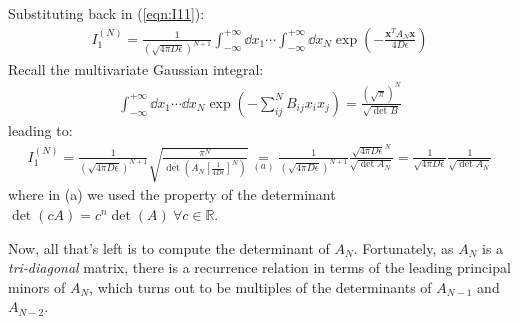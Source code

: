 \documentclass[../template.tex]{subfiles}
\begin{document}
Substituting back in (\ref{eqn:I11}):
\begin{align*}
    I_1^{(N)} = \frac{1}{(\sqrt{4 \pi D \epsilon})^{N+1}} \int_{-\infty}^{+\infty} \dd{x_1} \cdots \int_{-\infty}^{+\infty} \dd{x_N} \exp\left(-\frac{\bm{x}^T A_N \bm{x}}{4 D \epsilon}  \right)  
\end{align*}
Recall the multivariate Gaussian integral:
\begin{align*}
    \int_{-\infty}^{+\infty} \dd{x_1} \cdots \dd{x_N} \exp\left(-\sum_{ij}^N B_{ij} x_i x_j\right) = \frac{(\sqrt{\pi})^N}{\sqrt{\operatorname{det}B }} 
\end{align*}
leading to:
\begin{align}
    I_1^{(N)} = \frac{1}{(\sqrt{4 \pi D \epsilon})^{N+1}} \sqrt{\frac{\pi^N}{\operatorname{det}\left(A_N \left[\frac{1}{4 D \epsilon} \right]^N\right) } }  \underset{(a)}{=}  \frac{1}{(\sqrt{4 \pi D \epsilon})^{N+1}} \frac{\sqrt{4 \pi D \epsilon}^N}{\sqrt{\operatorname{det} A_N }} = \frac{1}{\sqrt{4 \pi D \epsilon}} \frac{1}{\sqrt{\operatorname{det} A_N}}    
    \label{eqn:I1n}
\end{align}
where in (a) we used the property of the determinant $\operatorname{det}(cA) = c^n \operatorname{det}(A) \> \forall c \in \mathbb{R}$.

Now, all that's left is to compute the determinant of $A_N$. Fortunately, as $A_N$ is a \textit{tri-diagonal} matrix, there is a recurrence relation in terms of the leading principal minors of $A_N$, which turns out to be multiples of the determinants of $A_{N-1}$ and $A_{N-2}$.
\end{document}

